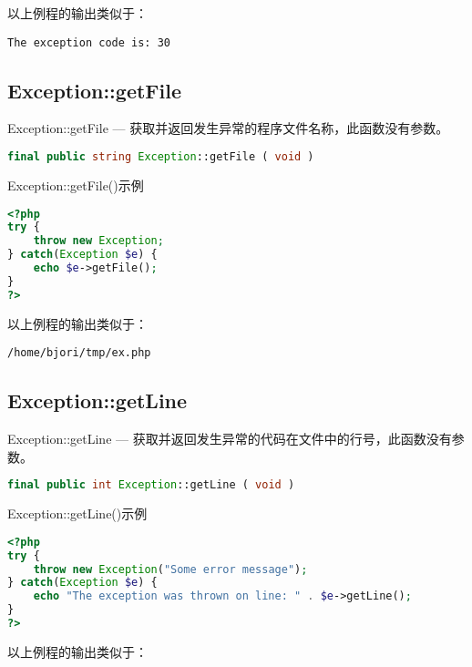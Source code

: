 以上例程的输出类似于：


\begin{verbatim}
The exception code is: 30
\end{verbatim}

\subsection{Exception::getFile}


Exception::getFile — 获取并返回发生异常的程序文件名称，此函数没有参数。

\begin{lstlisting}[language=PHP]
final public string Exception::getFile ( void )
\end{lstlisting}



\begin{example}
Exception::getFile()示例
\begin{lstlisting}[language=PHP]
<?php
try {
    throw new Exception;
} catch(Exception $e) {
    echo $e->getFile();
}
?>
\end{lstlisting}
\end{example}

以上例程的输出类似于：

\begin{verbatim}
/home/bjori/tmp/ex.php
\end{verbatim}


\subsection{Exception::getLine}

Exception::getLine — 获取并返回发生异常的代码在文件中的行号，此函数没有参数。


\begin{lstlisting}[language=PHP]
final public int Exception::getLine ( void )
\end{lstlisting}




\begin{example}
Exception::getLine()示例
\begin{lstlisting}[language=PHP]
<?php
try {
    throw new Exception("Some error message");
} catch(Exception $e) {
    echo "The exception was thrown on line: " . $e->getLine();
}
?>
\end{lstlisting}
\end{example}

以上例程的输出类似于：

